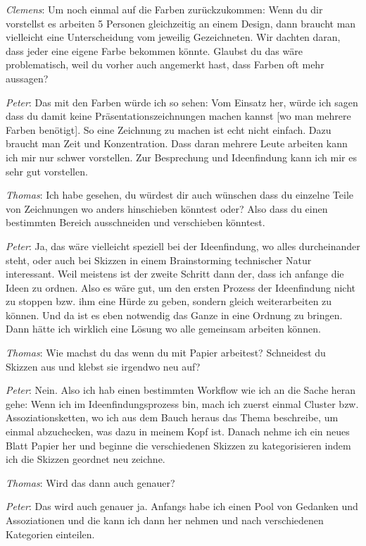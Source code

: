 \medskip \emph{Clemens}: Um noch einmal auf die Farben zurückzukommen: Wenn du dir vorstellst es arbeiten 5 Personen gleichzeitig an einem Design, dann braucht man vielleicht eine Unterscheidung vom jeweilig Gezeichneten. Wir dachten daran, dass jeder eine eigene Farbe bekommen könnte. Glaubst du das wäre problematisch, weil du vorher auch angemerkt hast, dass Farben oft mehr aussagen?

\medskip \emph{Peter}: Das mit den Farben würde ich so sehen: Vom Einsatz her, würde ich sagen dass du damit keine Präsentationszeichnungen machen kannst [wo man mehrere Farben benötigt]. So eine Zeichnung zu machen ist echt nicht einfach. Dazu braucht man Zeit und Konzentration. Dass daran mehrere Leute arbeiten kann ich mir nur schwer vorstellen. Zur Besprechung und Ideenfindung kann ich mir es sehr gut vorstellen.

\medskip \emph{Thomas}: Ich habe gesehen, du würdest dir auch wünschen dass du einzelne Teile von Zeichnungen wo anders hinschieben könntest oder? Also dass du einen bestimmten Bereich ausschneiden und verschieben könntest. 

\medskip \emph{Peter}: Ja, das wäre vielleicht speziell bei der Ideenfindung, wo alles durcheinander steht, oder auch bei Skizzen in einem Brainstorming technischer Natur interessant. Weil meistens ist der zweite Schritt dann der, dass ich anfange die Ideen zu ordnen. Also es wäre gut, um den ersten Prozess der Ideenfindung nicht zu stoppen bzw. ihm eine Hürde zu geben, sondern gleich weiterarbeiten zu können. Und da ist es eben notwendig das Ganze in eine Ordnung zu bringen. Dann hätte ich wirklich eine Lösung wo alle gemeinsam arbeiten können.

\medskip \emph{Thomas}: Wie machst du das wenn du mit Papier arbeitest? Schneidest du Skizzen aus und klebst sie irgendwo neu auf?

\medskip \emph{Peter}: Nein. Also ich hab einen bestimmten Workflow wie ich an die Sache heran gehe: Wenn ich im Ideenfindungsprozess bin, mach ich zuerst einmal Cluster bzw. Assoziationsketten, wo ich aus dem Bauch heraus das Thema beschreibe, um einmal abzuchecken, was dazu in meinem Kopf ist. Danach nehme ich ein neues Blatt Papier her und beginne die verschiedenen Skizzen zu kategorisieren indem ich die Skizzen geordnet neu zeichne.

\medskip \emph{Thomas}: Wird das dann auch genauer?

\medskip \emph{Peter}: Das wird auch genauer ja. Anfangs habe ich einen Pool von Gedanken und Assoziationen und die kann ich dann her nehmen und nach verschiedenen Kategorien einteilen.

